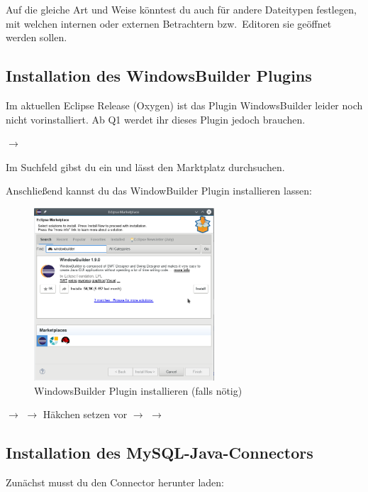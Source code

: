 Auf die gleiche Art und Weise könntest du auch für andere Dateitypen festlegen,
mit welchen internen oder externen Betrachtern bzw.\ Editoren sie geöffnet
werden sollen.


\subsection{Installation des WindowsBuilder Plugins}

Im aktuellen Eclipse Release (Oxygen) ist das Plugin WindowsBuilder leider noch
nicht vorinstalliert. Ab Q1 werdet ihr dieses Plugin jedoch brauchen.

 $\rightarrow$ 

Im Suchfeld gibst du  ein und lässt den Marktplatz
durchsuchen.

Anschließend kannst du das WindowBuilder Plugin installieren lassen:

\begin{figure}[h]
  \centering
   \includegraphics[width=0.6\textwidth]{./inf/SEKII/01_Vorbereitung/windowbuilder_plugin.png}
   \caption{WindowsBuilder Plugin installieren (falls nötig)}
   \label{fig:windowbuilder-plugin}
\end{figure}

$\rightarrow$  $\rightarrow$ Häkchen setzen vor
 $\rightarrow$  $\rightarrow$


\subsection{Installation des
MySQL-Java-Connectors}\label{mysql-connector-installation}

Zunächst musst du den Connector herunter laden:

